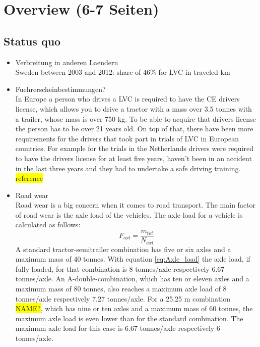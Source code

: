 \documentclass[ExampleMasters.tex]{subfiles}
\begin{document}
\clearpage
\chapter{Overview (6-7 Seiten)}
\label{chap:overview}


\section{Status quo}
\label{sec:legal_situation}

\begin{itemize}
	\item Verbreitung in anderen Laendern \\
	Sweden between 2003 and 2012: share of 46\% for LVC in traveled km \cite{balint2013correlation} 	
	\item Fuehrerscheinbestimmungen? \\
	In Europe a person who drives a LVC is required to have the CE drivers license, which allows you to drive a tractor with a  mass over 3.5 tonnes with a trailer, whose mass is over 750 kg. To be able to acquire that drivers license the person has to be over 21 years old. \cite{EU_driving_licenses} 
	On top of that, there have been more requirements for the drivers that took part in trials of LVC in European countries. For example for the trials in the Netherlands drivers were required to have the drivers license for at least five years, haven't been in an accident in the last three years and they had to undertake a safe driving training. \colorbox{yellow}{reference}     
	\item Road wear\\
	Road wear is a big concern when it comes to road transport. The main factor of road wear is the axle load of the vehicles.
	The axle load for a vehicle is calculated as follows:\\
	\begin{equation}
	F_{axl}=\frac{m_{tot}}{N_{axl}}
	\label{eq:Axle_load}
	\end{equation}
	A standard tractor-semitrailer combination has five or six axles and a maximum mass of 40 tonnes.
	With equation \eqref{eq:Axle_load} the axle load, if fully loaded, for that combination is 8 tonnes/axle respectively 6.67 tonnes/axle.
	An A-double-combination, which has ten or eleven axles and a maximum mass of 80 tonnes, also reaches a maximum axle  load of 8 tonnes/axle respectively 7.27 tonnes/axle.
	For a 25.25 m combination \colorbox{yellow}{NAME?}, which has nine or ten axles and a maximum mass of 60 tonnes, the maximum axle load is even lower than for the standard combination. The maximum axle load for this case is 6.67 tonnes/axle respectively 6 tonnes/axle. 
	
\end{itemize}
\end{document}
